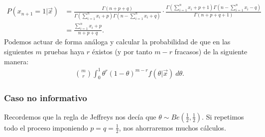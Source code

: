 \begin{align*}
     P(x_{n+1} = 1 | \vec{x}) &= \frac{\Gamma(n+p+q)}{\Gamma(\sum_{i=1}^{n} x_i + p)\Gamma(n-\sum_{i=1}^{n} x_i +q)} \cdot \frac{\Gamma(\sum_{i=1}^{n} x_i + p + 1)\Gamma(n -\sum_{i=1}^{n} x_i -q)}{\Gamma(n+p+q+1)} \\
     &= \frac{\sum_{i=1}^{n} x_i + p}{n+p+q}.
\end{align*}
Podemos actuar de forma análoga y calcular la probabilidad de que en las siguientes $m$ pruebas haya $r$ éxistos (y por tanto $m-r$ fracasos) de la siguiente manera:
\begin{align*}
  \binom{m}{r} \int_{0}^{1} \theta^r(1 - \theta)^{m-r} f(\theta | \vec{x}) \ d\theta.
\end{align*}

\subsubsection{Caso no informativo}
\noindent Recordemos que la regla de Jeffreys nos decía que $\theta \sim Be\left( \frac{1}{2}, \frac{1}{2}\right)$. Si repetimos todo el proceso imponiendo $p = q = \frac{1}{2}$, nos ahorraremos muchos cálculos.


